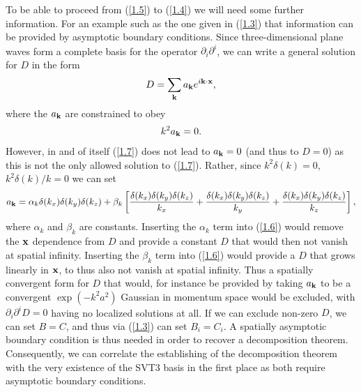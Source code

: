 \documentclass[aps,onecolumn,10pt]{revtex4}
\numberwithin{equation}{section}
\numberwithin{equation}{section}
\begin{document}
To be able to proceed from (\ref{1.5}) to (\ref{1.4}) we will need some further information. For an example such as the one given in (\ref{1.3}) that information can be provided by asymptotic boundary conditions. Since three-dimensional plane waves form a complete basis for the operator $\partial_i\partial^i$, we can write a general solution for $D$ in the form
%
\begin{eqnarray}
D=\sum _{\bf k}a_{\bf k}e^{i\textbf{k}\cdot \textbf{x}},
\label{1.6}
\end{eqnarray}
%
where the $a_{\bf k}$ are constrained to obey 
%
\begin{eqnarray}
k^2a_{\bf k}=0.
\label{1.7}
\end{eqnarray}
%
However, in and of itself (\ref{1.7}) does not lead to $a_{\bf k}=0$ (and thus to $D=0$) as this is not the only allowed solution to (\ref{1.7}). Rather, since $k^2\delta(k)=0$, $k^2\delta(k)/k=0$ we can set
%
\begin{eqnarray}
a_{\bf k}=\alpha_k\delta(k_x)\delta(k_y)\delta(k_z) +\beta_k\left[\frac{\delta (k_x)\delta (k_y)\delta (k_z)}{k_x}+\frac{\delta (k_x)\delta (k_y)\delta (k_z)}{k_y}+\frac{\delta (k_x)\delta (k_y)\delta (k_z)}{k_z}\right],
\label{1.8}
\end{eqnarray}
%
where $\alpha_k$ and $\beta_k$ are constants. Inserting the $\alpha_k$ term  into (\ref{1.6}) would remove the ${\bf x}$ dependence from $D$ and provide a constant $D$ that would then not vanish at spatial infinity. Inserting the $\beta_k$ term  into (\ref{1.6}) would provide a $D$ that grows linearly in ${\bf x}$, to thus also not vanish at spatial infinity. Thus a spatially convergent  form for $D$ that would, for instance  be provided by taking  $a_{\bf k}$ to be a convergent $\exp(-k^2a^2)$ Gaussian in momentum space would be excluded, with  $\partial_i\partial^iD=0$ having no localized solutions at all. If we can exclude non-zero $D$, we can set $B=C$, and thus via (\ref{1.3})  can set $B_i=C_i$.  A spatially asymptotic boundary condition is thus needed in order to recover a decomposition theorem. Consequently, we can correlate the establishing of the decomposition theorem with the very existence of the SVT3 basis in the first place as both require asymptotic boundary conditions.
\end{document}
